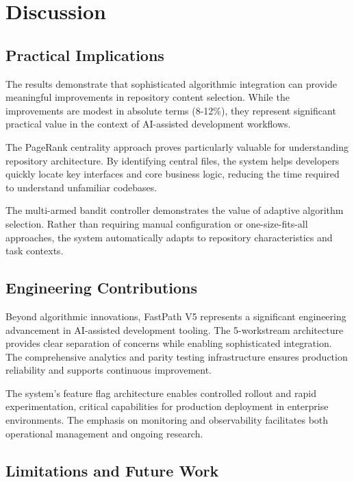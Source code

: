 \documentclass[conference]{IEEEtran}
\begin{document}
\section{Discussion}

\subsection{Practical Implications}

The results demonstrate that sophisticated algorithmic integration can provide meaningful improvements in repository content selection. While the improvements are modest in absolute terms (8-12\%), they represent significant practical value in the context of AI-assisted development workflows.

The PageRank centrality approach proves particularly valuable for understanding repository architecture. By identifying central files, the system helps developers quickly locate key interfaces and core business logic, reducing the time required to understand unfamiliar codebases.

The multi-armed bandit controller demonstrates the value of adaptive algorithm selection. Rather than requiring manual configuration or one-size-fits-all approaches, the system automatically adapts to repository characteristics and task contexts.

\subsection{Engineering Contributions}

Beyond algorithmic innovations, FastPath V5 represents a significant engineering advancement in AI-assisted development tooling. The 5-workstream architecture provides clear separation of concerns while enabling sophisticated integration. The comprehensive analytics and parity testing infrastructure ensures production reliability and supports continuous improvement.

The system's feature flag architecture enables controlled rollout and rapid experimentation, critical capabilities for production deployment in enterprise environments. The emphasis on monitoring and observability facilitates both operational management and ongoing research.

\subsection{Limitations and Future Work}
\end{document}
